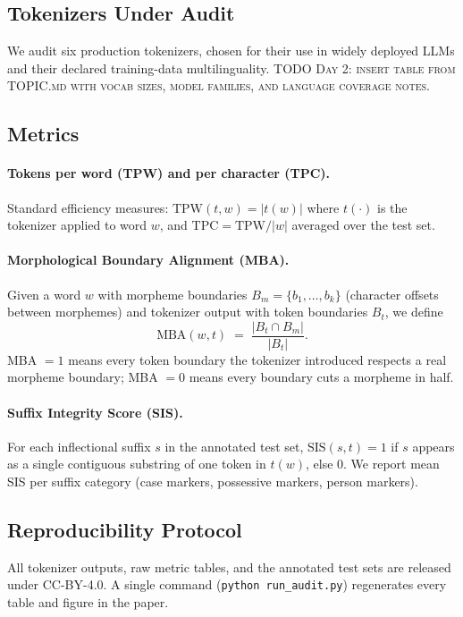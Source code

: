 \documentclass{article}
\begin{document}
\subsection{Tokenizers Under Audit}
\label{sec:tokenizers}
We audit six production tokenizers, chosen for their use in widely deployed LLMs and
their declared training-data multilinguality. \textsc{TODO Day 2: insert table from
TOPIC.md with vocab sizes, model families, and language coverage notes.}

\subsection{Metrics}
\label{sec:metrics}

\paragraph{Tokens per word (TPW) and per character (TPC).}
Standard efficiency measures: $\textrm{TPW}(t, w) = |t(w)|$ where $t(\cdot)$ is the
tokenizer applied to word $w$, and $\textrm{TPC} = \textrm{TPW}/|w|$ averaged over
the test set.

\paragraph{Morphological Boundary Alignment (MBA).}
Given a word $w$ with morpheme boundaries $B_m = \{b_1, \dots, b_k\}$ (character offsets
between morphemes) and tokenizer output with token boundaries $B_t$, we define
\[
  \textrm{MBA}(w, t) \;=\; \frac{|B_t \cap B_m|}{|B_t|}.
\]
MBA $= 1$ means every token boundary the tokenizer introduced respects a real morpheme
boundary; MBA $= 0$ means every boundary cuts a morpheme in half.

\paragraph{Suffix Integrity Score (SIS).}
For each inflectional suffix $s$ in the annotated test set, $\textrm{SIS}(s, t) = 1$
if $s$ appears as a single contiguous substring of one token in $t(w)$, else $0$.
We report mean SIS per suffix category (case markers, possessive markers, person markers).

\subsection{Reproducibility Protocol}
All tokenizer outputs, raw metric tables, and the annotated test sets are released
under CC-BY-4.0. A single command (\texttt{python run\_audit.py}) regenerates every
table and figure in the paper.
\end{document}
